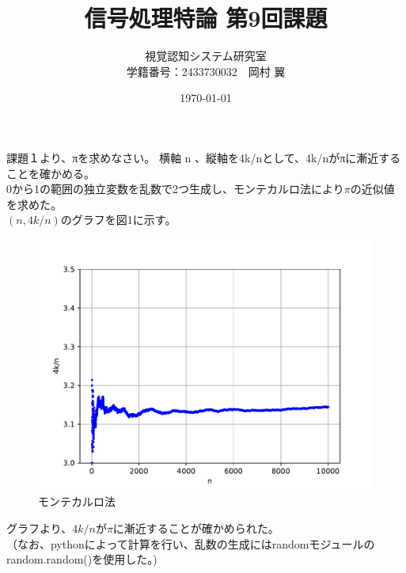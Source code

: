 \documentclass[10pt,dvipdfmx]{jsarticle}
\begin{document}
\title{信号処理特論 第9回課題}
\author{視覚認知システム研究室\\学籍番号：2433730032　岡村 翼}
\date{\today}
\maketitle

{ }
課題１より、πを求めなさい。
横軸 n 、縦軸を4k/nとして、4k/nがπに漸近することを確かめる。\\

0から1の範囲の独立変数を乱数で2つ生成し、モンテカルロ法により$\pi$の近似値を求めた。\\
$(n,4k/n)$のグラフを図1に示す。\\
  \begin{figure}[h]
    \begin{center}
      \includegraphics{Montecarlo.pdf}
      \caption{モンテカルロ法}
      \label{1}
    \end{center}
  \end{figure}
グラフより、$4k/n$が$\pi$に漸近することが確かめられた。\\
（なお、pythonによって計算を行い、乱数の生成にはrandomモジュールのrandom.random()を使用した。)
\end{document}
